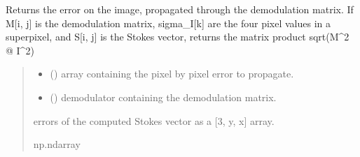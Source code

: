\documentclass[letterpaper,10pt,english]{sphinxmanual}
\begin{document}

\begin{fulllineitems}
\label{\detokenize{micropolarray.processing:micropolarray.processing.demodulation_errors.get_error_on_Stokes}}
\pysigstartsignatures
{}
\pysigstopsignatures
\sphinxAtStartPar
Returns the error on the image, propagated through the demodulation matrix. If M{[}i, j{]} is the demodulation matrix, sigma\_I{[}k{]} are the four pixel values in a superpixel, and S{[}i, j{]} is the Stokes vector, returns the matrix product
sqrt(M\textasciicircum{}2 @ I\textasciicircum{}2)
\begin{quote}\begin{description}
\begin{itemize}
\item {} 
\sphinxAtStartPar
{} () \textendash{} array containing the pixel by pixel error to propagate.

\item {} 
\sphinxAtStartPar
{} ({\hyperref[\detokenize{micropolarray.processing:micropolarray.processing.demodulation.Demodulator}]{}}) \textendash{} demodulator containing the demodulation matrix.

\end{itemize}

\sphinxAtStartPar
errors of the computed Stokes vector as a {[}3, y, x{]} array.

\sphinxAtStartPar
np.ndarray

\end{description}\end{quote}

\end{fulllineitems}
\end{document}
